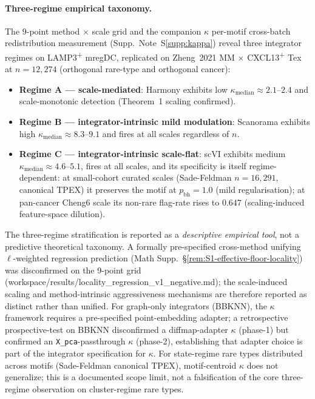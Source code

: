 \paragraph{Three-regime empirical taxonomy.} The 9-point method $\times$ scale grid and the companion $\kappa$ per-motif cross-batch redistribution measurement (Supp.~Note~S\ref{supp:kappa}) reveal three integrator regimes on LAMP3\textsuperscript{+} mregDC, replicated on Zheng~2021 MM $\times$ CXCL13\textsuperscript{+} Tex at $n=12{,}274$ (orthogonal rare-type and orthogonal cancer):
\begin{itemize}\itemsep0pt
    \item \textbf{Regime A --- scale-mediated}: Harmony exhibits low $\kappa_{\text{median}} \approx 2.1$--$2.4$ and scale-monotonic detection (Theorem~1 scaling confirmed).
    \item \textbf{Regime B --- integrator-intrinsic mild modulation}: Scanorama exhibits high $\kappa_{\text{median}} \approx 8.3$--$9.1$ and fires at all scales regardless of $n$.
    \item \textbf{Regime C --- integrator-intrinsic scale-flat}: scVI exhibits medium $\kappa_{\text{median}} \approx 4.6$--$5.1$, fires at all scales, and its specificity is itself regime-dependent: at small-cohort curated scales (Sade-Feldman $n=16{,}291$, canonical TPEX) it preserves the motif at $p_{\mathrm{bh}}=1.0$ (mild regularisation); at pan-cancer Cheng6 scale its non-rare flag-rate rises to $0.647$ (scaling-induced feature-space dilution).
\end{itemize}
The three-regime stratification is reported as a \emph{descriptive empirical tool}, not a predictive theoretical taxonomy. A formally pre-specified cross-method unifying $\ell$-weighted regression prediction (Math Supp.~§\ref{rem:S1-effective-floor-locality}) was disconfirmed on the 9-point grid (workspace/results/locality\_regression\_v1\_negative.md); the scale-induced scaling and method-intrinsic aggressiveness mechanisms are therefore reported as distinct rather than unified. For graph-only integrators (BBKNN), the $\kappa$ framework requires a pre-specified point-embedding adapter; a retrospective prospective-test on BBKNN disconfirmed a diffmap-adapter $\kappa$ (phase-1) but confirmed an \texttt{X\_pca}-passthrough $\kappa$ (phase-2), establishing that adapter choice is part of the integrator specification for $\kappa$. For state-regime rare types distributed across motifs (Sade-Feldman canonical TPEX), motif-centroid $\kappa$ does not generalize; this is a documented scope limit, not a falsification of the core three-regime observation on cluster-regime rare types.

